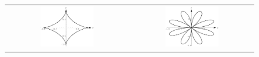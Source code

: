 \begin{figure}[t]
	\begin{center}
\begin{tabular}{cc}
\includegraphics[width=0.45\textwidth]{fig_parametric_18a} &  \includegraphics[width=0.45\textwidth]{fig_parametric_18b}\\



\end{tabular}
\end{center}
\end{figure}
